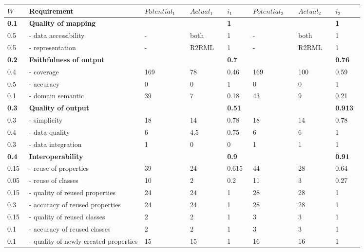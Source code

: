 \documentclass[ngerman,UKenglish,table]{scrbook}
\begin{document}
\begin{table}[!ht]
\centering
\setlength{\tabcolsep}{4pt}
\begin{tabular}{p{0.05\linewidth}|p{0.28\linewidth}|p{0.11\linewidth}|p{0.09\linewidth}|p{0.06\linewidth}|p{0.11\linewidth}|p{0.09\linewidth}|p{0.06\linewidth}}

\rowcolor[gray]{.7}
\hline
\textbf{$W$}  &\textbf{Requirement} & \textbf{$Potential_1$} & \textbf{$Actual_1$} & \textbf{$i_1$} & \textbf{$Potential_2$} & \textbf{$Actual_2$} & \textbf{$i_2$} \\
\hline

\rowcolor[gray]{.9}
\textbf{0.1} & \multicolumn{3}{l|}{\textbf{Quality of mapping}} &\textbf{1} & & & \textbf{1}\\

0.5 & - data accessibility & - & both & 1  & - & both & 1  \\
0.5 & - representation & - & R2RML & 1  & - & R2RML & 1 \\

\rowcolor[gray]{.9}
\textbf{0.2} & \multicolumn{3}{l|}{\textbf{Faithfulness of output}} &  \textbf{0.7}  & & & \textbf{0.76} \\

0.4 & \colorbox{gray!50}{- coverage} & 169 & 78 & \colorbox{gray!50}{0.46}  & 169 & 100 & 0.59 \\
0.5 & - accuracy & 0 & 0 &  1  &  0 & 0 & 1 \\
0.1 & - domain semantic & 39 & 7 & 0.18   & 43 & 9 & 0.21 \\

\rowcolor[gray]{.9}
\textbf{0.3} & \multicolumn{3}{l|}{\textbf{Quality of output}} &  \textbf{0.51}  & & & \textbf{0.913} \\

0.3 & - simplicity & 18  & 14 &  0.78  & 18 & 14 & 0.78  \\
0.4 & \colorbox{gray!50}{- data quality} & 6  & 4.5 &  \colorbox{gray!50}{0.75}  & 6 & 6 & 1  \\
0.3 & \colorbox{gray!50}{- data integration} & 1 & 0 &  \colorbox{gray!50}{0}  & 1 & 1 & 1 \\

\rowcolor[gray]{.9}
\textbf{0.4} & \multicolumn{3}{l|}{\textbf{Interoperability}} &  \textbf{0.9}   & & & \textbf{0.91} \\

0.15 & - reuse of properties & 39 & 24 &  0.615  & 44 & 28 & 0.64\\
0.05 & - reuse of classes & 10 & 2 &  0.2  & 11 & 3 & 0.27\\
0.15 & - quality of reused properties & 24 & 24 &  1   & 28 & 28 & 1 \\
0.3 & - accuracy of reused properties & 24 & 24 &  1  &  28 & 28 & 1 \\
0.15 & - quality of reused classes & 2 & 2 &  1   &  3 &3 & 1 \\
0.1 & - accuracy of reused classes & 2 & 2 &  1  & 3 & 3 &1 \\
0.1 & - quality of newly created properties & 15 & 15 &  1   & 16 & 16 &1 \\



\end{tabular}
\end{table}
\end{document}
